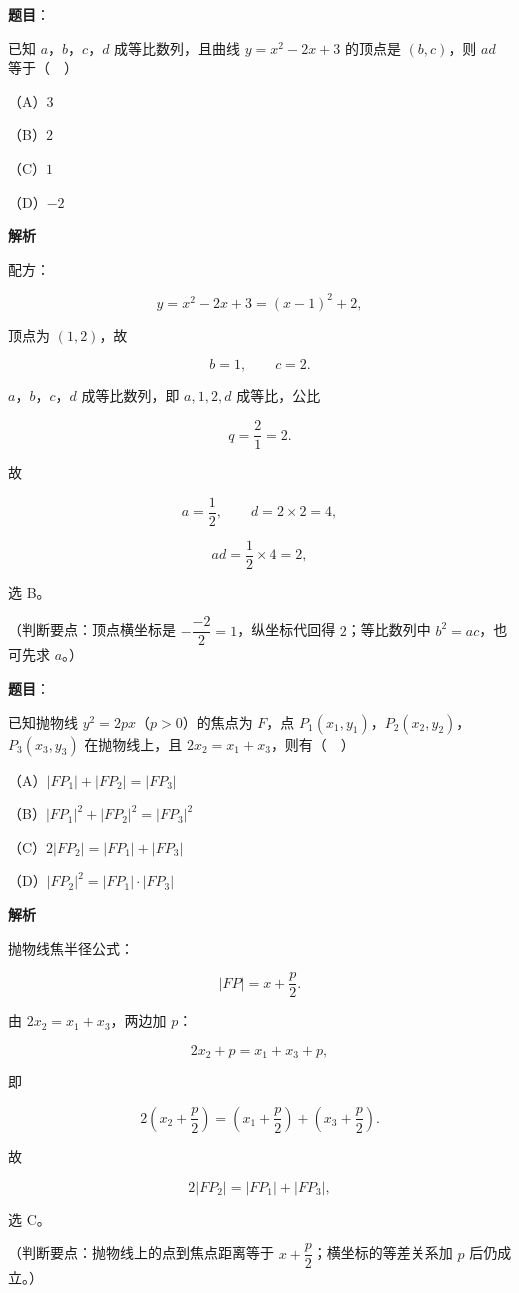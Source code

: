 \begin{answer}

\textbf{题目}：

已知 $a$，$b$，$c$，$d$ 成等比数列，且曲线 $y=x^2-2x+3$ 的顶点是 $(b,c)$，则 $ad$ 等于（　）

（A）$3$

（B）$2$

（C）$1$

（D）$-2$

\textbf{解析}

配方：

\nopagebreak[4]
\[y=x^2-2x+3=(x-1)^2+2,\]

顶点为 $(1,2)$，故

\nopagebreak[4]
\[b=1,\qquad c=2.\]

$a$，$b$，$c$，$d$ 成等比数列，即 $a,1,2,d$ 成等比，公比

\nopagebreak[4]
\[q=\frac21=2.\]

故

\nopagebreak[4]
\[a=\frac{1}{2},\qquad d=2\times2=4,\]

\nopagebreak[4]
\[ad=\frac12\times4=2,\]

选 B。

（判断要点：顶点横坐标是 $-\dfrac{-2}{2}=1$，纵坐标代回得 $2$；等比数列中 $b^2=ac$，也可先求 $a$。）


\end{answer}
\begin{answer}

\textbf{题目}：

已知抛物线 $y^2=2px$（$p>0$）的焦点为 $F$，点 $P_1(x_1,y_1)$，$P_2(x_2,y_2)$，$P_3(x_3,y_3)$ 在抛物线上，且 $2x_2=x_1+x_3$，则有（　）

（A）$|FP_1|+|FP_2|=|FP_3|$

（B）$|FP_1|^2+|FP_2|^2=|FP_3|^2$

（C）$2|FP_2|=|FP_1|+|FP_3|$

（D）$|FP_2|^2=|FP_1|\cdot|FP_3|$

\textbf{解析}

抛物线焦半径公式：

\nopagebreak[4]
\[|FP|=x+\frac p2.\]

由 $2x_2=x_1+x_3$，两边加 $p$：

\nopagebreak[4]
\[2x_2+p=x_1+x_3+p,\]

即

\nopagebreak[4]
\[2\left(x_2+\frac p2\right)=\left(x_1+\frac p2\right)+\left(x_3+\frac p2\right).\]

故

\nopagebreak[4]
\[2|FP_2|=|FP_1|+|FP_3|,\]

选 C。

（判断要点：抛物线上的点到焦点距离等于 $x+\dfrac p2$；横坐标的等差关系加 $p$ 后仍成立。）


\end{answer}
